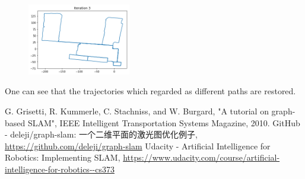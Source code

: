 \documentclass{article}
\begin{document}
\begin{figure}[h!]
  \centering
  \includegraphics[width=0.4\textwidth]{4-3_by_deleji_3.png}
\end{figure}

One can see that the trajectories which regarded as different paths are restored.

\newpage

\begin{thebibliography}{99}
   G. Grisetti, R. Kummerle, C. Stachniss, and W. Burgard,
    "A tutorial on graph-based SLAM",
    IEEE Intelligent Transportation Systems Magazine,
    2010.
   GitHub - deleji/graph-slam: 一个二维平面的激光图优化例子,
  \url{https://github.com/deleji/graph-slam}
   Udacity - Artificial Intelligence for Robotics: Implementing SLAM,
  \url{https://www.udacity.com/course/artificial-intelligence-for-robotics--cs373}
\end{thebibliography}
\end{document}
